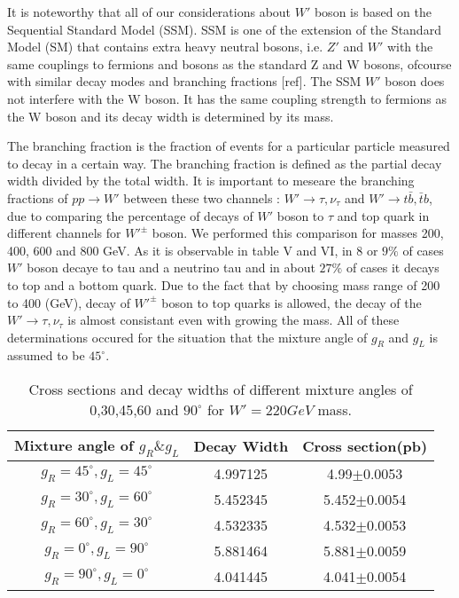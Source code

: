 It is noteworthy that all of our considerations about $ W' $ boson is based on the Sequential Standard Model (SSM). SSM is one of the extension of the Standard Model (SM) that contains extra heavy neutral bosons, i.e. $ Z' $ and $ W' $ with the same couplings to fermions and bosons as the standard Z and W bosons, ofcourse with similar decay modes and branching fractions [ref]. The SSM $ W' $ boson does not interfere with the W boson. It has the same coupling strength to fermions as the W boson and its decay width is determined by its mass. 

  The branching fraction is the fraction of events for a particular particle measured to decay in a certain way. The branching fraction is defined as the partial decay width divided by the total width. It is important to meseare the branching fractions of $ pp\rightarrow W'$ between these two channels : $ W'\rightarrow \tau,\nu_\tau $ and $ W'\rightarrow  t \bar{b},\bar{t}b $, due to comparing the percentage of decays of $ W' $ boson to $ \tau $ and top quark in different channels for $ W'^\pm $ boson. We performed this comparison for masses 200, 400, 600 and 800 GeV. As it is observable in table V and VI, in 8 or $9\%$ of cases $W'$ boson decaye to tau and a neutrino tau and in about $27\%$ of cases it decays to top and a bottom quark. Due to the fact that by choosing mass range of 200 to 400 (GeV), decay of $ W'^\pm $ boson to top quarks is allowed, the decay of the $ W'\rightarrow \tau,\nu_\tau $ is almost consistant even with growing the mass. All of these determinations occured for the situation that the mixture angle of $ g_R$ and  $g_L$ is assumed to be $45^\circ $. 
 



\begin{table}[htb]
	\centering
\begin{tabular}{|c|c|c|}
\hline 
Mixture angle of $ g_R \& g_L $  &  Decay Width  &  Cross section(pb)\\
\hline 
$g_R=45^\circ,g_L=45^\circ$& 4.997125& 4.99$\pm$0.0053\\
$g_R=30^\circ,g_L=60^\circ$ &5.452345& 5.452$\pm$0.0054\\
$g_R=60^\circ,g_L=30^\circ$& 4.532335& 4.532$\pm$0.0053 \\
$g_R=0^\circ,g_L=90^\circ$&5.881464& 5.881$\pm$0.0059\\
$g_R=90^\circ,g_L=0^\circ$& 4.041445& 4.041$\pm$0.0054\\


\hline
\end{tabular}
\caption{Cross sections and decay widths of different mixture angles of 0,30,45,60 and $90^\circ$ for $W' =220 GeV$ mass. \label{tab:220 GeV} }
\end{table}


